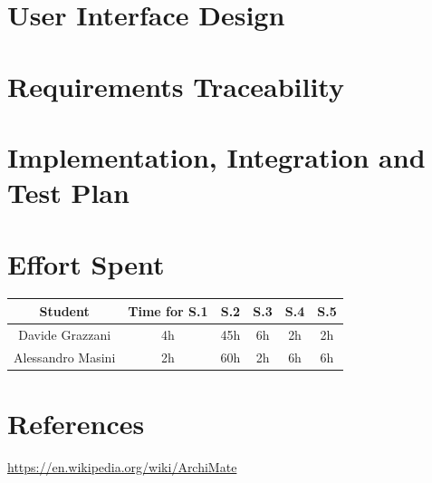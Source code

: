 \documentclass[table, 12pt]{article}
\begin{document}
    \section{User Interface Design}\label{sec:user_interface_design}
        
        \newpage
    
    \section{Requirements Traceability}\label{sec:requirements_traceability}
        
        \newpage

    \section{Implementation, Integration and Test Plan}\label{sec:implementation_integration_and_test_plan}
        
        \newpage
   
    \section{Effort Spent}
        \begin{table}[H]
            \centering
            \begin{tabular}{| c | c | c| c| c | c |}
                \hline
                Student & Time for S.1 & S.2 & S.3 & S.4 & S.5\\ \hline
                Davide Grazzani & 4h & 45h & 6h & 2h & 2h\\
                Alessandro Masini & 2h & 60h & 2h & 6h & 6h\\
                \hline
            \end{tabular}
        \end{table}
    \section{References}

    \begin{thebibliography}{9}
            \url{https://en.wikipedia.org/wiki/ArchiMate}  
    \end{thebibliography}
\end{document}
